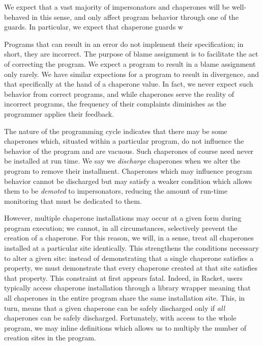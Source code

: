 \documentclass{sigplanconf}
\begin{document}
We expect that a vast majority of impersonators and chaperones will be well-behaved in this sense, and only affect program behavior through one of the guards.
In particular, we expect that chaperone guards w



Programs that can result in an error do not implement their specification; in short, they are incorrect.
The purpose of blame assignment is to facilitate the act of correcting the program.
We expect a program to result in a blame assignment only rarely.
We have similar expections for a program to result in divergence, and that specifically at the hand of a chaperone value.
In fact, we never expect such behavior from correct programs, and while chaperones serve the reality of incorrect programs, the frequency of their complaints diminishes as the programmer applies their feedback.


The nature of the programming cycle indicates that there may be some chaperones which, situated within a particular program, do not influence the behavior of the program and are vacuous.
Such chaperones of course need never be installed at run time.
We say we \emph{discharge} chaperones when we alter the program to remove their installment.
Chaperones which may influence program behavior cannot be discharged but may satisfy a weaker condition which allows them to be \emph{demoted} to impersonators, reducing the amount of run-time monitoring that must be dedicated to them.

However, multiple chaperone installations may occur at a given  form during program execution; we cannot, in all circumstances, selectively prevent the creation of a chaperone.
For this reason, we will, in a sense, treat all chaperones installed at a particular site identically.
This strengthens the conditions necessary to alter a given site: instead of demonstrating that a single chaperone satisfies a property, we must demonstrate that every chaperone created at that site satisfies that property.
This constraint at first appears fatal.
Indeed, in Racket, users typically access chaperone installation through a library wrapper meaning that all chaperones in the entire program share the same installation site.
This, in turn, means that a given chaperone can be safely discharged only if \emph{all} chaperones can be safely discharged.
Fortunately, with access to the whole program, we may inline definitions which allows us to multiply the number of creation sites in the program.

\end{document}
